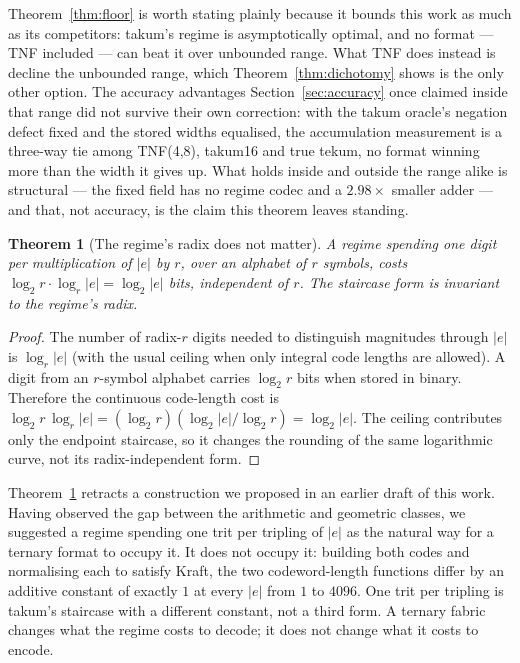 \documentclass[11pt]{article}
\newtheorem{theorem}{Theorem}
\theoremstyle{definition}
\begin{document}
Theorem~\ref{thm:floor} is worth stating plainly because it bounds this work as
much as its competitors: takum's regime is asymptotically optimal, and no format
--- TNF included --- can beat it over unbounded range. What TNF does instead is
decline the unbounded range, which Theorem~\ref{thm:dichotomy} shows is the only
other option. The accuracy advantages Section~\ref{sec:accuracy} once claimed inside that
range did not survive their own correction: with the takum oracle's negation
defect fixed and the stored widths equalised, the accumulation measurement is
a three-way tie among TNF(4,8), takum16 and true tekum, no format winning more
than the width it gives up. What holds inside and outside the range alike is
structural --- the fixed field has no regime codec and a $2.98\times$ smaller
adder --- and that, not accuracy, is the claim this theorem leaves standing.

\begin{theorem}[The regime's radix does not matter]
\label{thm:radixinv}
A regime spending one digit per multiplication of $|e|$ by $r$, over an alphabet
of $r$ symbols, costs $\log_2 r \cdot \log_r |e| = \log_2 |e|$ bits, independent
of $r$. The staircase form is invariant to the regime's radix.
\end{theorem}
\begin{proof}
The number of radix-$r$ digits needed to distinguish magnitudes through $|e|$
is $\log_r|e|$ (with the usual ceiling when only integral code lengths are
allowed).  A digit from an $r$-symbol alphabet carries $\log_2r$ bits when
stored in binary.  Therefore the continuous code-length cost is
$\log_2r\,\log_r|e|=(\log_2r)(\log_2|e|/\log_2r)=\log_2|e|$.
The ceiling contributes only the endpoint staircase, so it changes the
rounding of the same logarithmic curve, not its radix-independent form.
\end{proof}

Theorem~\ref{thm:radixinv} retracts a construction we proposed in an earlier draft
of this work. Having observed the gap between the arithmetic and geometric
classes, we suggested a regime spending one trit per tripling of $|e|$ as the
natural way for a ternary format to occupy it. It does not occupy it: building
both codes and normalising each to satisfy Kraft, the two codeword-length
functions differ by an additive constant of exactly $1$ at every $|e|$ from $1$ to
$4096$. One trit per tripling is takum's staircase with a different constant, not
a third form. A ternary fabric changes what the regime costs to decode; it does
not change what it costs to encode.
\end{document}
